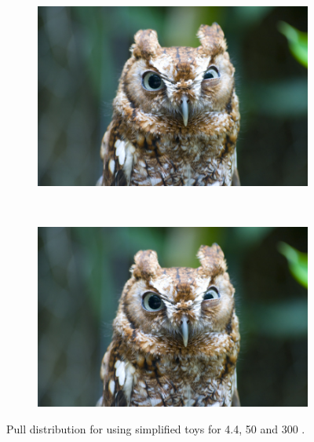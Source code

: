 {\begin{figure}[htbp]
   \begin{subfigure}[b]{0.48\textwidth}
        \includegraphics[width= \textwidth]{./Figs/placeholder.jpeg}
    \end{subfigure}
   ~ %
    \begin{subfigure}[b]{0.48\textwidth}
       \includegraphics[width=\textwidth]{./Figs/placeholder.jpeg}
   \end{subfigure}
    \caption{Pull distribution for \Gmumu using simplified toys for 4.4, 50 and 300 \fb.}
    \label{fig:gamma pulls}
\end{figure}



}
